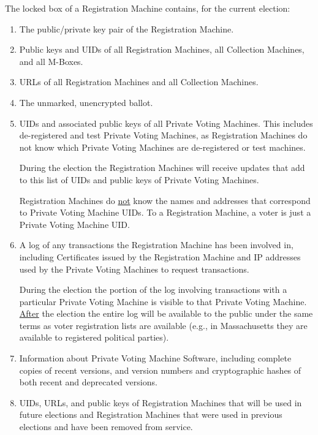 \documentclass[12pt]{article}
\begin{document}
The locked box of a Registration Machine contains, for the
current election:
\begin{enumerate}
\item The public/private key pair of the Registration Machine.
\item Public keys and UIDs of all Registration Machines, all Collection
Machines, and all M-Boxes.
\item URLs of all Registration Machines and all Collection Machines.
\item The unmarked, unencrypted ballot.
\item UIDs and associated public keys of all Private Voting
Machines.  This includes de-registered and test Private Voting
Machines, as Registration Machines do not know which Private Voting
Machines are de-registered or test machines.

During the election the Registration Machines will receive updates
that add to this list of UIDs and public keys of Private Voting
Machines.

Registration Machines do \underline{not} know the names and addresses that
correspond to Private Voting Machine UIDs.  To a Registration
Machine, a voter is just a Private Voting Machine UID.

\item A log of any transactions the Registration Machine has
been involved in, including Certificates issued by the Registration Machine
and IP addresses used by
the Private Voting Machines to request transactions.

During the election the portion of the log involving transactions with
a particular Private Voting Machine is visible to that Private Voting
Machine.  \underline{After} the election the entire log will be available
to the public under the same terms as voter registration lists are
available (e.g., in Massachusetts they are available to registered
political parties).
\item Information about Private Voting Machine Software, including
complete copies of recent versions, and version numbers and
cryptographic hashes of both recent and deprecated versions.
\item UIDs, URLs, and public keys of Registration Machines that will be used
in future elections and Registration Machines that were used in previous
elections and have been removed from service.
\end{enumerate}
\end{document}
